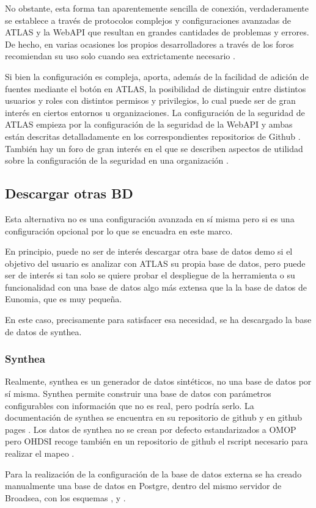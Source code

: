 No obstante, esta forma tan aparentemente sencilla de conexión, verdaderamente se establece a través de protocolos complejos y configuraciones avanzadas de ATLAS y la WebAPI que resultan en grandes cantidades de problemas y errores. De hecho, en varias ocasiones los propios desarrolladores a través de los foros recomiendan su uso solo cuando sea extrictamente necesario \cite{forumAddMSDB}\cite{forumAddSecurityAtlas}.

Si bien la configuración es compleja, aporta, además de la facilidad de adición de fuentes mediante el botón en ATLAS, la posibilidad de distinguir entre distintos usuarios y roles con distintos permisos y privilegios, lo cual puede ser de gran interés en ciertos entornos u organizaciones.  La configuración de la seguridad de ATLAS empieza por la configuración de la seguridad de la WebAPI y ambas están descritas detalladamente en los correspondientes repositorios de Github \cite{githubWASecurity}\cite{githubATSecurity}. También hay un foro de gran interés en el que se describen aspectos de utilidad sobre la configuración de la seguridad en una organización \cite{forumAddSecurityAtlas}.

\subsection{Descargar otras BD} \label{cap:04.2.2OtrasBD}

Esta alternativa no es una configuración avanzada en sí misma pero si es una configuración opcional por lo que se encuadra en este marco. 

En principio, puede no ser de interés descargar otra base de datos demo si el objetivo del usuario es analizar con ATLAS su propia base de datos, pero puede ser de interés si tan solo se quiere probar el despliegue de la herramienta o su funcionalidad con una base de datos algo más extensa que la la base de datos de Eunomia, que es muy pequeña.

En este caso, precisamente para satisfacer esa necesidad, se ha descargado la base de datos de synthea.

\subsubsection{Synthea}

Realmente, synthea es un generador de datos sintéticos, no una base de datos por sí misma. Synthea permite construir una base de datos con parámetros configurables con información que no es real, pero podría serlo. La documentación de synthea se encuentra en su repositorio de github \cite{githubSynthea} y en github pages \cite{githubPagesSynthea}. Los datos de synthea no se crean por defecto estandarizados a OMOP pero OHDSI recoge también en un repositorio de github el rscript necesario para realizar el mapeo \cite{githubETLSynthea}.

Para la realización de la configuración de la base de datos externa se ha creado manualmente una base de datos en Postgre, dentro del mismo servidor de Broadsea, con los esquemas ,  y . 
